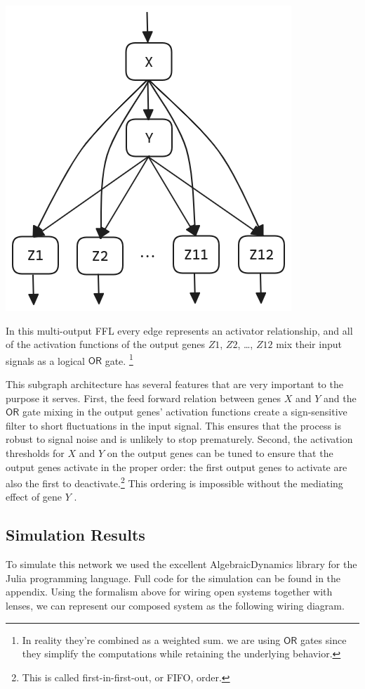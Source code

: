 \documentclass[12pt]{article}
\begin{document}
\begin{center}
  \includegraphics*[scale=0.35]{multioutput_FFL.png}
\end{center}

In this multi-output FFL every edge represents an activator relationship, and all of the activation functions of the output genes $Z1$, $Z2$, \dots, $Z12$ mix their input signals as a logical $\mathsf{OR}$ gate.
\footnote{In reality they're combined as a weighted sum. we are using $\mathsf{OR}$ gates since they simplify the computations while retaining the underlying behavior.}

This subgraph architecture has several features that are very important to the purpose it serves.
First, the feed forward relation between genes $X$ and $Y$ and the $\mathsf{OR}$ gate mixing in the output genes' activation functions create a sign-sensitive filter to short fluctuations in the input signal.
This ensures that the process is robust to signal noise and is unlikely to stop prematurely.
Second, the activation thresholds for $X$ and $Y$ on the output genes can be tuned to ensure that the output genes activate in the proper order: the first output genes to activate are also the first to deactivate.\footnote{This is called first-in-first-out, or FIFO, order.}
This ordering is impossible without the mediating effect of gene $Y$ \cite{alon2019introduction}.


\subsection*{Simulation Results}
To simulate this network we used the excellent AlgebraicDynamics library for the Julia programming language.
Full code for the simulation can be found in the appendix.
Using the formalism above for wiring open systems together with lenses, we can represent our composed system as the following wiring diagram.
\end{document}
